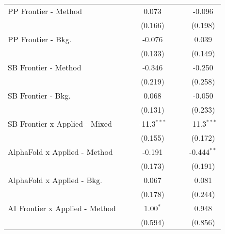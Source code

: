 \begin{tabular}{lcccccc}
   PP Frontier - Method           &                &               & 0.073         &                &               & -0.096\\   
                                  &                &               & (0.166)       &                &               & (0.198)\\   
   PP Frontier - Bkg.             &                &               & -0.076        &                &               & 0.039\\   
                                  &                &               & (0.133)       &                &               & (0.149)\\   
   SB Frontier - Method           &                &               & -0.346        &                &               & -0.250\\   
                                  &                &               & (0.219)       &                &               & (0.258)\\   
   SB Frontier - Bkg.             &                &               & 0.068         &                &               & -0.050\\   
                                  &                &               & (0.131)       &                &               & (0.233)\\   
   SB Frontier x Applied - Mixed  &                &               & -11.3$^{***}$ &                &               & -11.3$^{***}$\\   
                                  &                &               & (0.155)       &                &               & (0.172)\\   
   AlphaFold x Applied - Method   &                &               & -0.191        &                &               & -0.444$^{**}$\\   
                                  &                &               & (0.173)       &                &               & (0.191)\\   
   AlphaFold x Applied - Bkg.     &                &               & 0.067         &                &               & 0.081\\   
                                  &                &               & (0.178)       &                &               & (0.244)\\   
   AI Frontier x Applied - Method &                &               & 1.00$^{*}$    &                &               & 0.948\\   
                                  &                &               & (0.594)       &                &               & (0.856)\\   

\end{tabular}
